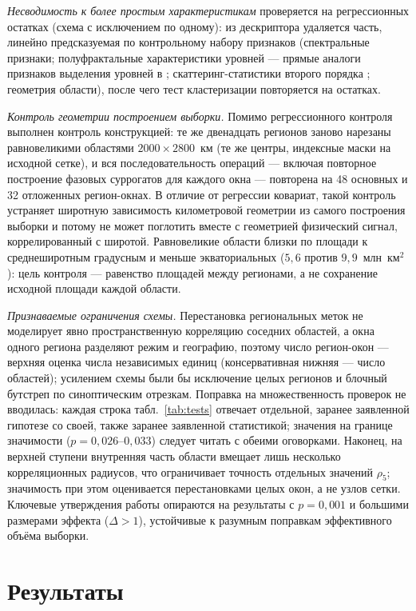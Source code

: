 \documentclass[11pt,a4paper]{article}
\begin{document}
\emph{Несводимость к более простым характеристикам} проверяется на регрессионных остатках (схема с исключением по одному): из дескриптора удаляется часть, линейно предсказуемая по контрольному набору признаков (спектральные признаки; полуфрактальные характеристики уровней --- прямые аналоги признаков выделения уровней в \cite{Krenke2019}; скаттеринг-статистики второго порядка \cite{Cheng2024}; геометрия области), после чего тест кластеризации повторяется на остатках.

\emph{Контроль геометрии построением выборки.} Помимо регрессионного контроля выполнен контроль конструкцией: те же двенадцать регионов заново нарезаны равновеликими областями $2000\times2800$~км (те же центры, индексные маски на исходной сетке), и вся последовательность операций --- включая повторное построение фазовых суррогатов для каждого окна --- повторена на 48 основных и 32 отложенных регион-окнах. В отличие от регрессии ковариат, такой контроль устраняет широтную зависимость километровой геометрии из самого построения выборки и потому не может поглотить вместе с геометрией физический сигнал, коррелированный с широтой. Равновеликие области близки по площади к среднеширотным градусным и меньше экваториальных ($5{,}6$ против $9{,}9$~млн~км$^2$): цель контроля --- равенство площадей между регионами, а не сохранение исходной площади каждой области.

\emph{Признаваемые ограничения схемы.} Перестановка региональных меток не моделирует явно пространственную корреляцию соседних областей, а окна одного региона разделяют режим и географию, поэтому число регион-окон --- верхняя оценка числа независимых единиц (консервативная нижняя --- число областей); усилением схемы были бы исключение целых регионов и блочный бутстреп по синоптическим отрезкам. Поправка на множественность проверок не вводилась: каждая строка табл.~\ref{tab:tests} отвечает отдельной, заранее заявленной гипотезе со своей, также заранее заявленной статистикой; значения на границе значимости ($p=0{,}026$--$0{,}033$) следует читать с обеими оговорками. Наконец, на верхней ступени внутренняя часть области вмещает лишь несколько корреляционных радиусов, что ограничивает точность отдельных значений $\rho_5$; значимость при этом оценивается перестановками целых окон, а не узлов сетки. Ключевые утверждения работы опираются на результаты с $p=0{,}001$ и большими размерами эффекта ($\Delta>1$), устойчивые к разумным поправкам эффективного объёма выборки.

\section{Результаты}
\label{sec:results}
\end{document}

